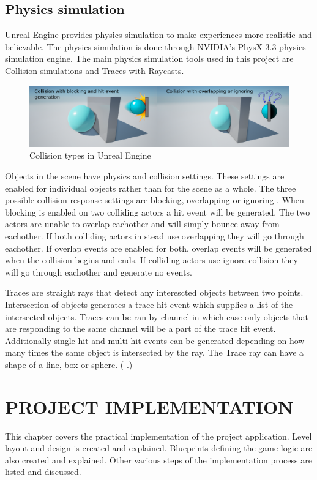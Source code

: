 \documentclass[12pt, a4paper,oneside, nocenter]{thesis}
\newcommand{\citeyeartitlexamk}[1]{(\usebibentry{#1}{title} \citeyear{#1}.)}
\begin{document}
\section{Physics simulation}
Unreal Engine provides physics simulation to make experiences more realistic and believable. The physics simulation is done through NVIDIA's PhysX 3.3 physics simulation engine. The main physics simulation tools used in this project are Collision simulations and Traces with Raycasts.
\begin{figure}[H]
	\includegraphics[width=\textwidth]{collision-types}
	\caption{Collision types in Unreal Engine}
	\label{fig:collision-types}
\end{figure}
Objects in the scene have physics and collision settings. These settings are enabled for individual objects rather than for the scene as a whole. The three possible collision response settings are blocking, overlapping or ignoring . When blocking is enabled on two colliding actors a hit event will be generated. The two actors are unable to overlap eachother and will simply bounce away from eachother. If both colliding actors in stead use overlapping they will go through eachother. If overlap events are enabled for both, overlap events will be generated when the collision begins and ends. If colliding actors use ignore collision they will go through eachother and generate no events.
\par
Traces are straight rays that detect any interescted objects between two points. Intersection of objects generates a trace hit event which supplies a list of the intersected objects. Traces can be ran by channel in which case only objects that are responding to the same channel will be a part of the trace hit event. Additionally single hit and multi hit events can be generated depending on how many times the same object is intersected by the ray. The Trace ray can have a shape of a line, box or sphere. \citeyeartitlexamk{ue-traces}
\par
\chapter{\MakeUppercase{Project implementation}}
This chapter covers the practical implementation of the project application. Level layout and design is created and explained. Blueprints defining the game logic are also created and explained. Other various steps of the implementation process are listed and discussed.
\end{document}
